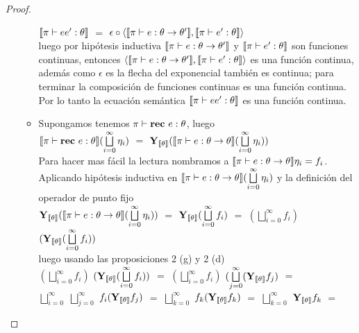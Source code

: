 \begin{proof}
\begin{itemize}
\begin{itemize}
$\llbracket \pi \vdash ee' : \theta \rrbracket$ $=$
$\epsilon \circ \langle \llbracket \pi \vdash e : \theta \rightarrow \theta' \rrbracket
					     ,\llbracket \pi \vdash e' : \theta \rrbracket \rangle$\\

luego por hip\'otesis inductiva $\llbracket \pi \vdash e : \theta \rightarrow \theta' \rrbracket$ y
$\llbracket \pi \vdash e' : \theta \rrbracket$ son funciones continuas, entonces
$\langle \llbracket \pi \vdash e : \theta \rightarrow \theta' \rrbracket
					     ,\llbracket \pi \vdash e' : \theta \rrbracket \rangle$ es una funci\'on continua,
adem\'as como $\epsilon$ es la flecha del exponencial tambi\'en es continua; para
terminar la composici\'on de funciones continuas es una funci\'on continua. Por lo tanto
la ecuaci\'on sem\'antica $\llbracket \pi \vdash ee' : \theta \rrbracket$ es una funci\'on 
continua.

\item Supongamos tenemos $\pi \vdash \textbf{rec} \ e : \theta$, luego\\

$\llbracket \pi \vdash \textbf{rec} \ e : \theta \rrbracket(\bigsqcup\limits^{\infty}_{i=0} \eta_i)$ $=$ 
$\textbf{Y}_{\llbracket \theta \rrbracket}
	(\llbracket \pi \vdash e : \theta \rightarrow \theta \rrbracket (\bigsqcup\limits^{\infty}_{i=0} \eta_i))$\\

Para hacer mas f\'acil la lectura nombramos a $\llbracket \pi \vdash e : \theta \rightarrow \theta \rrbracket\eta_i = f_i$. Aplicando hip\'otesis inductiva en $\llbracket \pi \vdash e : \theta \rightarrow \theta \rrbracket (\bigsqcup\limits^{\infty}_{i=0} \eta_i)$ y la definici\'on del operador 
de punto fijo\\

$\textbf{Y}_{\llbracket \theta \rrbracket}
	(\llbracket \pi \vdash e : \theta \rightarrow \theta \rrbracket (\bigsqcup\limits^{\infty}_{i=0} \eta_i))$ $=$
$\textbf{Y}_{\llbracket \theta \rrbracket}
	(\bigsqcup\limits^{\infty}_{i=0} f_i)$ $=$
$(\bigsqcup\limits^{\infty}_{i=0} f_i)$ $(\textbf{Y}_{\llbracket \theta \rrbracket}(\bigsqcup\limits^{\infty}_{i=0} f_i))$\\

luego usando las proposiciones 2 (g) y 2 (d)\\

$(\bigsqcup\limits^{\infty}_{i=0} f_i)$ $(\textbf{Y}_{\llbracket \theta \rrbracket}(\bigsqcup\limits^{\infty}_{i=0} f_i))$ $=$
$(\bigsqcup\limits^{\infty}_{i=0} f_i)$ $(\bigsqcup\limits^{\infty}_{j=0} (\textbf{Y}_{\llbracket \theta \rrbracket}f_j)$ $=$\\

$\bigsqcup\limits^{\infty}_{i=0}$ $\bigsqcup\limits^{\infty}_{j=0}$ $f_i (\textbf{Y}_{\llbracket \theta \rrbracket}f_j)$ $=$
$\bigsqcup\limits^{\infty}_{k=0}$ $f_k (\textbf{Y}_{\llbracket \theta \rrbracket}f_k)$ $=$
$\bigsqcup\limits^{\infty}_{k=0}$ $\textbf{Y}_{\llbracket \theta \rrbracket}f_k$ $=$\\


\end{itemize}
\end{itemize}
\end{proof}
